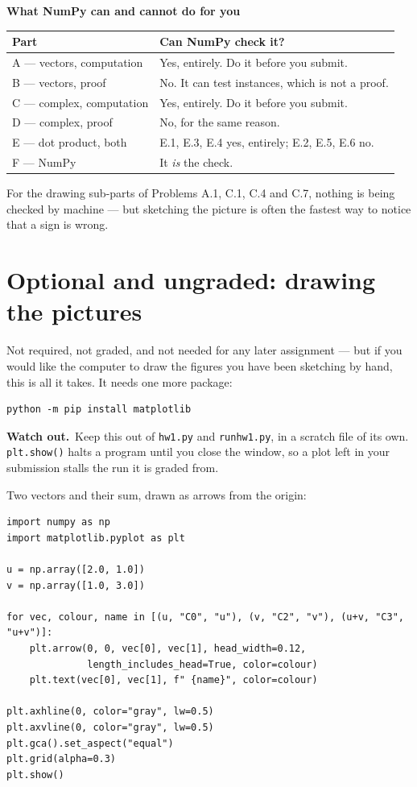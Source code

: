 \documentclass[11pt]{article}
\theoremstyle{definition}
\newcommand{\heads}[1]{\par\smallskip\noindent
  {\small\sffamily\textcolor{BrickRed}{\textbf{Watch out.}}\ #1}\par\smallskip}
\newenvironment{callout}[1]
  {\par\medskip\needspace{5\baselineskip}%
   \begin{lrbox}{\qcbox}%
   \begin{minipage}{\dimexpr\textwidth-2\fboxsep-4pt}%
   \setlength{\parskip}{0.4em}%
   \textbf{\sffamily\color{RoyalBlue}#1}\par}
  {\end{minipage}\end{lrbox}%
   \begin{center}\colorbox{softbg}{\usebox{\qcbox}}\end{center}\medskip}
\begin{document}
\begin{callout}{What NumPy can and cannot do for you}
\renewcommand{\arraystretch}{1.25}
\begin{tabular}{@{}l l@{}}
\toprule
\textbf{Part} & \textbf{Can NumPy check it?} \\
\midrule
A --- vectors, computation      & Yes, entirely. Do it before you submit. \\
B --- vectors, proof            & No. It can test instances, which is not a proof. \\
C --- complex, computation      & Yes, entirely. Do it before you submit. \\
D --- complex, proof            & No, for the same reason. \\
E --- dot product, both         & E.1, E.3, E.4 yes, entirely; E.2, E.5, E.6 no. \\
F --- NumPy                     & It \emph{is} the check. \\
\bottomrule
\end{tabular}

\smallskip
For the drawing sub-parts of Problems A.1, C.1, C.4 and C.7, nothing is
being checked by machine --- but sketching the picture is often the fastest way
to notice that a sign is wrong.
\end{callout}

\section*{Optional and ungraded: drawing the pictures}
\noindent Not required, not graded, and not needed for any later assignment ---
but if you would like the computer to draw the figures you have been sketching
by hand, this is all it takes. It needs one more package:

\begin{lstlisting}
python -m pip install matplotlib
\end{lstlisting}

\heads{Keep this out of \texttt{hw1.py} and \texttt{runhw1.py}, in a scratch file
of its own. \texttt{plt.show()} halts a program until you close the window, so a
plot left in your submission stalls the run it is graded from.}

\noindent Two vectors and their sum, drawn as arrows from the origin:

\begin{lstlisting}
import numpy as np
import matplotlib.pyplot as plt

u = np.array([2.0, 1.0])
v = np.array([1.0, 3.0])

for vec, colour, name in [(u, "C0", "u"), (v, "C2", "v"), (u+v, "C3", "u+v")]:
    plt.arrow(0, 0, vec[0], vec[1], head_width=0.12,
              length_includes_head=True, color=colour)
    plt.text(vec[0], vec[1], f" {name}", color=colour)

plt.axhline(0, color="gray", lw=0.5)
plt.axvline(0, color="gray", lw=0.5)
plt.gca().set_aspect("equal")
plt.grid(alpha=0.3)
plt.show()
\end{lstlisting}
\end{document}
